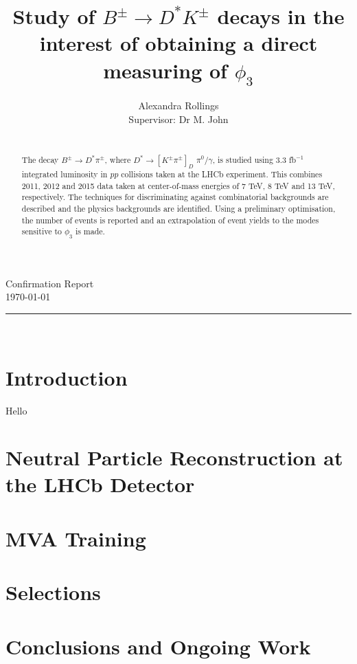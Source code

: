 \documentclass[oneside,12pt]{article}
\title{
      \LARGE \textbf{Study of $B^{\pm} \rightarrow D^{*}K^{\pm}$ decays in the interest of obtaining a direct measuring of $\phi_3$} \\
		}
\author{
		Alexandra Rollings\\	
		Supervisor: Dr M. John\\	
}
\makeatletter
\newcommand{\HRule}[1]{\rule{\linewidth}{#1}}     %
\def\printtitle{%
  {\centering \@title\par}}
\def\printauthor{%
  {\centering \large \@author}}
\makeatother
\begin{document}
\begin{titlepage}
\thispagestyle{empty} 
\begin{flushright}
\normalsize {Confirmation Report} 	%
\\ \normalsize \today			%
\end{flushright}
\HRule{0.5pt} \\						%
[2.0cm]
\printtitle 
\vspace{75pt}
\printauthor
\vfill
\begin{abstract}
\noindent
\\
  The decay $B^{\pm} \rightarrow D^{*}\pi^{\pm}$, where $D^{*} \rightarrow [K^{\pm}\pi^{\pm}]_D$ $\pi^{0}\text{/}\gamma$, is studied using 3.3 fb$^{-1}$ integrated luminosity in $pp$ collisions taken at the LHCb experiment. This combines 2011, 2012 and 2015 data taken at center-of-mass energies of 7 TeV, 8 TeV and 13 TeV, respectively. The techniques for discriminating
  against combinatorial backgrounds are described and the physics backgrounds are identified. Using a preliminary optimisation, the number of events is reported and an extrapolation of event yields to the modes sensitive to $\phi_3$ is made. 
\end{abstract}
\vfill
\end{titlepage}
\setcounter{page}{1}
\section{\normalsize Introduction}
Hello
\section{Neutral Particle Reconstruction at the LHCb Detector} \label{detector}
\section{MVA Training} \label{MVA}
\section{Selections} \label{selections}
\section{Conclusions and Ongoing Work} \label{conclusion}
\end{document}
